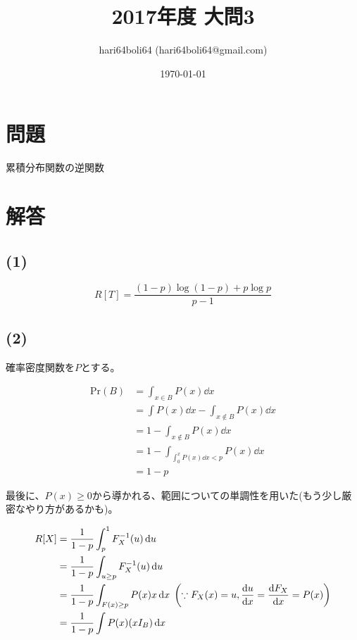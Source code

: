\documentclass[a4paper, 10pt, dvipdfmx]{jlreq}
\begin{document}
\title{2017年度 大問3}
\author{hari64boli64 (hari64boli64@gmail.com)}
\date{\today}
\maketitle

\section{問題}

累積分布関数の逆関数

\section{解答}

\subsection*{(1)}

\begin{equation*}
  R[T]=\frac{(1-p)\log(1-p)+p\log{p}}{p-1}
\end{equation*}

\subsection*{(2)}

確率密度関数を$P$とする。

\begin{align*}
  \mathrm{Pr}(B) & = \int_{x \in B} P(x) \dd{x}                       \\
                 & = \int P(x) \dd{x} - \int_{x \notin B} P(x) \dd{x} \\
                 & = 1 - \int_{x \notin B} P(x) \dd{x}                \\
                 & = 1 - \int_{\int_0^x P(x) \dd{x} < p} P(x) \dd{x}  \\
                 & = 1 - p
\end{align*}

最後に、$P(x) \geq 0$から導かれる、範囲についての単調性を用いた(もう少し厳密なやり方があるかも)。

\begin{align*}
  R[X] & =\frac{1}{1-p}\int_p^1 F_X^{-1}(u) \dd{u}                                                            \\
       & =\frac{1}{1-p}\int_{u \geq p} F_X^{-1}(u) \dd{u}                                                     \\
       & =\frac{1}{1-p}\int_{F(x) \geq p} P(x)x \dd{x} \; \qty(\because F_X(x)=u, \dv{u}{x}=\dv{F_X}{x}=P(x)) \\
       & =\frac{1}{1-p}\int P(x) (xI_B) \dd{x}
\end{align*}
\end{document}
